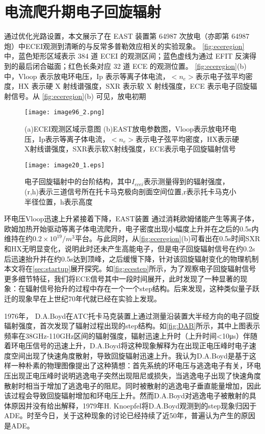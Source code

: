 \section{电流爬升期电子回旋辐射}
通过优化光路设置，本文展示了在 EAST 装置第 64987 次放电（亦即第 64987 炮）中ECEI观测到清晰的与反常多普勒效应相关的实验现象。 \autoref{fig:eceregion} 中，蓝色矩形区域表示 384 道 ECEI 的观测区间；蓝色虚线为通过 EFIT 反演得到的最后闭合磁面；红色长条对应 32 道 ECE 的观测位置。 \autoref{fig:eceregion}(b) 中，Vloop 表示放电环电压，Ip 表示等离子体电流，$<n_e>$表示电子弦平均密度，HX 表示硬 X 射线谱强度，SXR 表示软 X 射线强度，ECE 表示电子回旋辐射信号。从 \autoref{fig:eceregion}(b) 可见，放电初期
\begin{figure}[ht]
\centering
\texttt{[image: image96\_2.png]}
\caption{\label{fig:eceregion}(a)ECEI观测区域示意图 (b)EAST放电参数图，Vloop表示放电环电压，Ip表示等离子体电流，$<n_e>$表示电子弦平均密度，HX表示硬X射线谱强度，SXR表示软X射线强度，ECE表示电子回旋辐射信号}
\end{figure}
\begin{figure}[ht]
\centering
\texttt{[image: image20\_1.eps]}
\caption{\label{fig:ecestep}电子回旋辐射中的台阶结构，其中$I_{ecei}$表示测量得到的辐射强度，(r,h)表示三道信号所在托卡马克极向剖面空间位置,r表示托卡马克小半径位置，h表示高度}
\end{figure}
环电压Vloop迅速上升紧接着下降，EAST装置 通过消耗欧姆储能产生等离子体，欧姆加热开始驱动等离子体电流爬升，电子密度出现小幅度上升并在之后的0.5s内维持在约$0.2\times10^{19}/m^3$平台。与此同时，从\autoref{fig:eceregion}(b)可看出在0.5s时间SXR和HX无明显变化，说明此时还未产生高能电子，但是电子回旋辐射信号在约0.2s后迅速抬升并在约0.5s达到顶峰，之后缓慢下降，针对该回旋辐射变化的物理机制本文将在\autoref{sec:startup}展开探究。如\autoref{fig:ecestep}所示，为了观察电子回旋辐射信号更多细节特征，我们将ECE信号其中一段时间展开，此时发现了一种显著的现象：在辐射信号抬升的过程中存在一个一个step结构。后来发现，这种类似量子跃迁的现象早在上世纪70年代就已经在实验上发现\cite{RN725}。\par
1976年， D.A.Boyd\cite{RN725}在ATC托卡马克装置上通过测量沿装置大半经方向的电子回旋辐射强度，首次发现了辐射过程出现的step结构。如\autoref{fig:DAB}所示，其中上图表示频率在38GHz-110GHz区间的辐射强度，辐射迅速上升时（上升时间<10μs）伴随着环电压信号的迅速上升，D.A.Boyd将这种现象解释为在出现正电压峰时电子速度空间出现了快速角度散射，导致回旋辐射迅速上升。我认为D.A.Boyd是基于这样一种朴素的物理图像提出了这种猜想：首先系统的环电压与逃逸电子有关，环电压出现正电压峰时说明逃逸电子突然出现阻尼或损失，当逃逸电子出现了快速角度散射时相当于增加了逃逸电子的阻尼。同时被散射的逃逸电子垂直能量增加，因此该过程会导致回旋辐射增加和环电压上升。然而D.A.Boyd对逃逸电子被散射的具体原因并没有给出解释，1979年H. Knoepfel将D.A.Boyd观测到的step现象归因于ADE\cite{RN1030}。时至今日，关于这种现象的讨论已经持续了近50年\cite{RN1863,RN964,RN786,RN1866,RN1554,RN2102,RN1868,RN975,RN1859,RN798}，普遍认为产生的原因是ADE。
